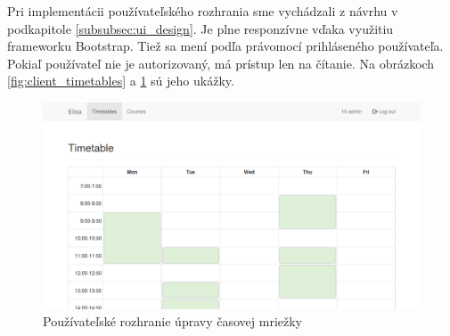 Pri implementácii používateľského rozhrania sme vychádzali z návrhu v
podkapitole \ref{subsubsec:ui_design}. Je plne responzívne vďaka využitiu
frameworku Bootstrap. Tiež sa mení podľa právomocí prihláseného používateľa.
Pokiaľ používateľ nie je autorizovaný, má prístup len na čítanie. Na obrázkoch
\ref{fig:client_timetables} a \ref{fig:client_grid} sú jeho ukážky. \\

\begin{figure}[hb]
  \centering
  \includegraphics[width=\textwidth]{figures/client-grid.png}
  \caption{\label{fig:client_grid} Používateľské rozhranie úpravy časovej
    mriežky}
\end{figure}
